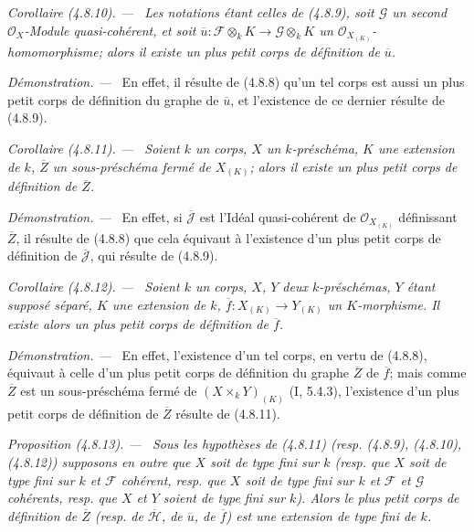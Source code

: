 \documentclass[10pt,oneside]{book}
\newcommand{\oldpage}[2][]{%
  \setcounter{footnote}{0}%
  \marginpar{\scriptsize\textbf{#1}~|~#2}\ignorespaces}
\newenvironment{proposition}[1][]{%
  \par\medskip\noindent\itshape Proposition (#1). ---\ }{\par}
\newenvironment{corollary}[1][]{%
  \par\medskip\noindent\itshape Corollaire (#1). ---\ }{\par}
\newenvironment{proof}{%
  \par\medskip\noindent\textit{Démonstration. ---\ }}{\par}
\begin{document}
\begin{corollary}[4.8.10]
\label{IV.2.4.8.10-fr}
Les notations étant celles de (4.8.9), soit $\mathscr G$ un second
$\mathcal O_X$-Module quasi-cohérent, et soit
$\overline u:\mathscr F\otimes_kK\to\mathscr G\otimes_kK$ un
$\mathcal O_{X_{(K)}}$-homomorphisme; alors il existe un plus petit corps de
définition de $\overline u$.
\end{corollary}

\oldpage[IV-2]{83}

\begin{proof}
En effet, il résulte de (4.8.8) qu'un tel corps est aussi un plus petit corps
de définition du graphe de $\overline u$, et l'existence de ce dernier résulte
de (4.8.9).
\end{proof}

\begin{corollary}[4.8.11]
\label{IV.2.4.8.11-fr}
Soient $k$ un corps, $X$ un $k$-préschéma, $K$ une extension de $k$,
$\overline Z$ un sous-préschéma fermé de $X_{(K)}$; alors il existe un plus
petit corps de définition de $\overline Z$.
\end{corollary}

\begin{proof}
En effet, si $\overline{\mathscr J}$ est l'Idéal quasi-cohérent de
$\mathcal O_{X_{(K)}}$ définissant $\overline Z$, il résulte de (4.8.8) que
cela équivaut à l'existence d'un plus petit corps de définition de
$\overline{\mathscr J}$, qui résulte de (4.8.9).
\end{proof}

\begin{corollary}[4.8.12]
\label{IV.2.4.8.12-fr}
Soient $k$ un corps, $X$, $Y$ deux $k$-préschémas, $Y$ étant supposé séparé,
$K$ une extension de $k$, $\overline f:X_{(K)}\to Y_{(K)}$ un $K$-morphisme.
Il existe alors un plus petit corps de définition de $\overline f$.
\end{corollary}

\begin{proof}
En effet, l'existence d'un tel corps, en vertu de (4.8.8), équivaut à celle
d'un plus petit corps de définition du graphe $\overline Z$ de $\overline f$;
mais comme $\overline Z$ est un sous-préschéma fermé de
$(X\times_kY)_{(K)}$ (I, 5.4.3), l'existence d'un plus petit corps de
définition de $\overline Z$ résulte de (4.8.11).
\end{proof}

\begin{proposition}[4.8.13]
\label{IV.2.4.8.13-fr}
Sous les hypothèses de (4.8.11) (resp. (4.8.9), (4.8.10), (4.8.12))
supposons en outre que $X$ soit de type fini sur $k$ (resp. que $X$ soit de
type fini sur $k$ et $\mathscr F$ cohérent, resp. que $X$ soit de type fini
sur $k$ et $\mathscr F$ et $\mathscr G$ cohérents, resp. que $X$ et $Y$
soient de type fini sur $k$). Alors le plus petit corps de définition de
$\overline Z$ (resp. de $\overline{\mathscr H}$, de $\overline u$, de $\overline f$) est
une extension de type fini de $k$.
\end{proposition}
\end{document}
